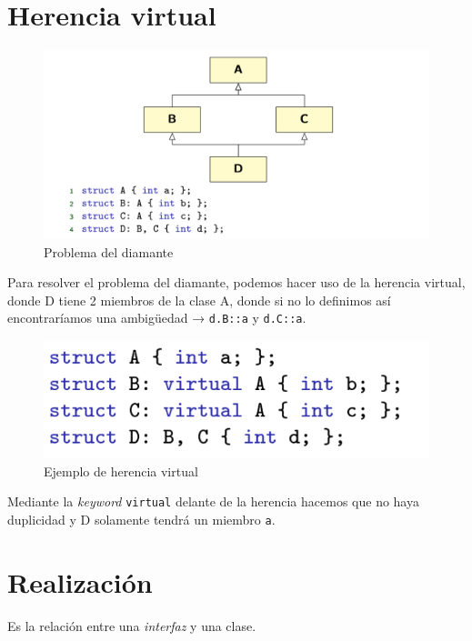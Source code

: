 \newpage

\section{Herencia virtual}
\begin{center}
	\begin{figure}[h]
	\includegraphics[width=\textwidth]{Imagenes/gen9.png}
	\caption{Problema del diamante}
\end{figure}
\end{center}
Para resolver el problema del diamante, podemos hacer uso de la herencia virtual, donde D tiene 2 miembros de la clase A, donde si no lo definimos así encontraríamos una ambigüedad → \texttt{d.B::a} y \texttt{d.C::a}.  
\begin{center}
	\begin{figure}[h]
	\includegraphics[width=\textwidth]{Imagenes/gen10.png}
	\caption{Ejemplo de herencia virtual}
\end{figure}
\end{center}
Mediante la \textit{keyword} \texttt{virtual} delante de la herencia hacemos que no haya duplicidad y D solamente tendrá un miembro \texttt{a}.

\newpage
\section{Realización}
Es la relación entre una \textit{interfaz} y una clase.

